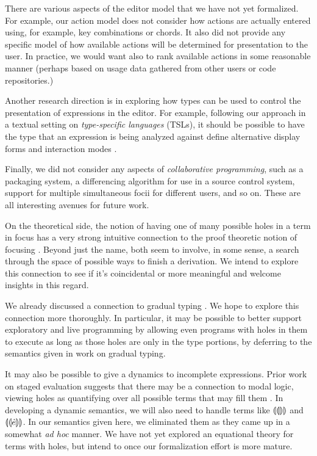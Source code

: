 \documentclass{llncs}
\begin{document}
There are various aspects of the editor model that we have not yet formalized. For example, our action model does not consider how actions are actually entered using, for example, key combinations or chords. It also did not provide any specific model of how available actions will be determined for presentation to the user. In practice, we would want also to rank available actions in some reasonable manner (perhaps based on usage data gathered from other users or code repositories.)

Another research direction is in exploring how types can be used to control the presentation of expressions in the editor. For example, following our approach in a textual setting on \emph{type-specific languages} (TSLs), it should be possible to have the type that an expression is being analyzed against define alternative display forms and interaction modes \cite{TSLs}.

Finally, we did not consider any aspects of \emph{collaborative programming}, such as a packaging system, a differencing algorithm for use in a source control system, support for multiple simultaneous focii for different users, and so on. These are all interesting avenues for future work.


On the theoretical side, the notion of having one of many possible holes in a term in focus has a very strong intuitive connection
  to the proof theoretic notion of focusing \cite{Simmons11tr}. Beyond just
  the name, both seem to involve, in some sense, a search through the space of possible
  ways to finish a derivation. We intend to explore this connection to see
  if it's coincidental or more meaningful and welcome insights in this regard.

We already discussed a connection to gradual typing \cite{Siek06a}. We hope to explore this connection more thoroughly. In particular, it may be possible to better support exploratory and live programming by allowing even programs with holes in them to execute as long as those holes are only in the type portions, by deferring to the semantics given in work on gradual typing.

It may also be possible to give a dynamics to incomplete expressions. Prior work on staged evaluation suggests that there may be a connection to modal logic, viewing holes as quantifying over all possible terms that may fill them \cite{DBLP:journals/jacm/DaviesP01}. In developing a dynamic semantics, we will also need to handle terms like $\llparenthesis\llparenthesis\rrparenthesis\rrparenthesis$ and 
$\llparenthesis\llparenthesis\dot{e}\rrparenthesis\rrparenthesis$. In our semantics given here, we eliminated them as they came up in a somewhat \emph{ad hoc} manner. We have not yet
explored an equational theory for terms with holes, but intend to once our
formalization effort is more mature.
\end{document}
